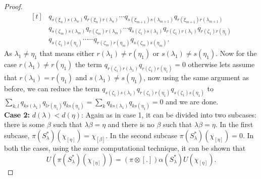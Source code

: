 \documentclass[10pt,a4paper]{amsart}
\begin{document}
\begin{proof}
\begin{equation*}
\begin{aligned}[t]
&q_{s(\xi_{n})s(\lambda_{n})}q_{r(\xi_{n})r(\lambda_{n})}
\cdots q_{s(\xi_{m+1})s(\lambda_{m+1})}q_{r(\xi_{m+1})r(\lambda_{m+1})}\\
&q_{s(\zeta_{m})s(\lambda_{m})}q_{r(\zeta_{m})r(\lambda_{m})}
\cdots
q_{s(\zeta_{1})s(\lambda_{1})}q_{r(\zeta_{1})r(\lambda_{1})}q_{r(\zeta_{1})r(\eta_{1})}\\
&q_{s(\zeta_{1})s(\eta_{1})}\cdots\cdots q_{r(\zeta_{m})r(\eta_{m})}q_{s(\zeta_{m})s(\eta_{m})}.
\end{aligned}
\end{equation*}
As 
$\lambda_{1}\neq \eta_{1}$ that means either $r(\lambda_{1})\neq r(\eta_{1})$ or $s(\lambda_{1})\neq s(\eta_{1})$. Now for the case $r(\lambda_{1})\neq r(\eta_{1})$ the term $q_{r(\zeta_{1})r(\lambda_{1})}q_{r(\zeta_{1})r(\eta_{1})}=0$ otherwise lets assume that $r(\lambda_{1})= r(\eta_{1})$ and $s(\lambda_{1})\neq s(\eta_{1})$, 
now using the same argument as before, we can reduce the term $q_{s(\zeta_{1})s(\lambda_{1})}q_{r(\zeta_{1})r(\eta_{1})}q_{s(\zeta_{1})s(\eta_{1})}$ to $\sum\limits_{k,l}q_{ks(\lambda_{1})}q_{lr(\eta_{1})}q_{ks(\eta_{1})}=\sum\limits_{k}q_{ks(\lambda_{1})}q_{ks(\eta_{1})}=0$
and we are done.\\
\textbf{Case 2:} $d(\lambda)<d(\eta)$: Again as in case 1, it can be divided into two subcases: there is some $\beta$ such that $\lambda\beta=\eta$ and there is no $\beta$ such that $\lambda\beta=\eta$. In the first subcase, $\pi(S_{\lambda}^{\ast})(\chi_{[\eta]})=\chi_{[\beta]}$. In the second subcase $\pi(S_{\lambda}^{\ast})(\chi_{[\eta]})=0$. In both the cases, using the same computational technique, it can be shown that 
\begin{displaymath}
    U(\pi(S_{\lambda}^{\ast})(\chi_{[\eta]}))=(\pi\otimes[.])\alpha(S_{\lambda}^{\ast})U(\chi_{[\eta]}).
\end{displaymath}


\end{proof}
\end{document}

